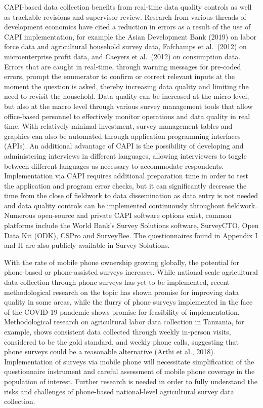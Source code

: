 \documentclass[
]{book}
\begin{document}
CAPI-based data collection benefits from real-time data quality controls as well as trackable revisions and supervisor review. Research from various threads of development economics have cited a reduction in errors as a result of the use of CAPI implementation, for example the Asian Development Bank (2019) on labor force data and agricultural household survey data, Fafchamps et al.~(2012) on microenterprise profit data, and Caeyers et al.~(2012) on consumption data. Errors that are caught in real-time, through warning messages for pre-coded errors, prompt the enumerator to confirm or correct relevant inputs at the moment the question is asked, thereby increasing data quality and limiting the need to revisit the household. Data quality can be increased at the micro level, but also at the macro level through various survey management tools that allow office-based personnel to effectively monitor operations and data quality in real time. With relatively minimal investment, survey management tables and graphics can also be automated through application programming interfaces (APIs). An additional advantage of CAPI is the possibility of developing and administering interviews in different languages, allowing interviewers to toggle between different languages as necessary to accommodate respondents. Implementation via CAPI requires additional preparation time in order to test the application and program error checks, but it can significantly decrease the time from the close of fieldwork to data dissemination as data entry is not needed and data quality controls can be implemented continuously throughout fieldwork. Numerous open-source and private CAPI software options exist, common platforms include the World Bank's Survey Solutions software, SurveyCTO, Open Data Kit (ODK), CSPro and SurveyBee. The questionnaires found in Appendix I and II are also publicly available in Survey Solutions.

With the rate of mobile phone ownership growing globally, the potential for phone-based or phone-assisted surveys increases. While national-scale agricultural data collection through phone surveys has yet to be implemented, recent methodological research on the topic has shown promise for improving data quality in some areas, while the flurry of phone surveys implemented in the face of the COVID-19 pandemic shows promise for feasibility of implementation. Methodological research on agricultural labor data collection in Tanzania, for example, shows consistent data collected through weekly in-person visits, considered to be the gold standard, and weekly phone calls, suggesting that phone surveys could be a reasonable alternative (Arthi et al., 2018). Implementation of surveys via mobile phone will necessitate simplification of the questionnaire instrument and careful assessment of mobile phone coverage in the population of interest. Further research is needed in order to fully understand the risks and challenges of phone-based national-level agricultural survey data collection.
\end{document}
